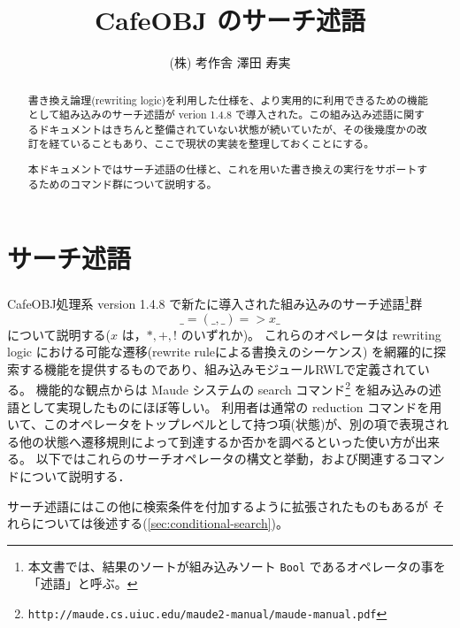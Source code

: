 \documentclass{article}
\title{CafeOBJ のサーチ述語}
\author{(株) 考作舎 澤田 寿実}
\begin{document}
\maketitle
\begin{abstract}
書き換え論理(rewriting logic)を利用した仕様を、より実用的に利用できるための機能として組み込みのサーチ述語が verion 1.4.8 で導入された。この組み込み述語に関するドキュメントはきちんと整備されていない状態が続いていたが、その後幾度かの改訂を経ていることもあり、ここで現状の実装を整理しておくことにする。

本ドキュメントではサーチ述語の仕様と、これを用いた書き換えの実行をサポートするためのコマンド群について説明する。
\end{abstract}
\tableofcontents
\listoffigures
\listoftables
\newpage

\section{サーチ述語}
\label{sec:search-predicate}
CafeOBJ処理系 version 1.4.8 で新たに導入された組み込みのサーチ述語\footnote{本文書では、結果のソートが組み込みソート \texttt{Bool} であるオペレータの事を「述語」と呼ぶ。}群
\[\_=(\_,\_)=>x\_\]
について説明する($x$ は，$*, +, !$  のいずれか)。
これらのオペレータは rewriting logic における可能な遷移(rewrite ruleによる書換えのシーケンス) を網羅的に探索する機能を提供するものであり、組み込みモジュールRWLで定義されている。
機能的な観点からは Maude システムの search コマンド\footnote{
\texttt{http://maude.cs.uiuc.edu/maude2-manual/maude-manual.pdf}}
を組み込みの述語として実現したものにほぼ等しい。
利用者は通常の reduction コマンドを用いて、このオペレータをトップレベルとして持つ項(状態)が、別の項で表現される他の状態へ遷移規則によって到達するか否かを調べるといった使い方が出来る。
以下ではこれらのサーチオペレータの構文と挙動，および関連するコマンドについて説明する．

サーチ述語にはこの他に検索条件を付加するように拡張されたものもあるが
それらについては後述する(\ref{sec:conditional-search})。
\end{document}
